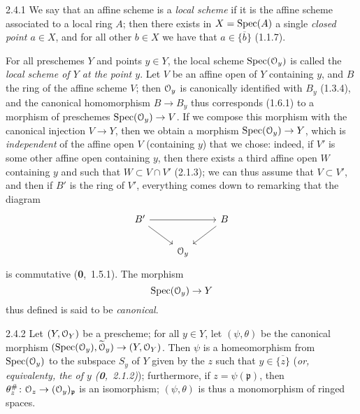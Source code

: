 \documentclass[../main.tex]{subfiles}
\begin{document}
    \begin{cx}{2.4.1}
        We say that an affine scheme is a \emph{local scheme} if it is the affine scheme associated to a local ring $A$; then there exists in $X=\operatorname{Spec}(A)$ a single \emph{closed point $a\in X$}, and for all other $b\in X$ we have that $a\in\overline{\{b\}}$ (1.1.7).
    \end{cx}
    
    For all preschemes $Y$ and points $y\in Y$, the local scheme $\operatorname{Spec}(\mathcal{O}_y)$ is called the \emph{local scheme of $Y$ at the point $y$}.
    Let $V$ be an affine open of $Y$ containing $y$, and $B$ the ring of the affine scheme $V$; then $\mathcal{O}_y$ is canonically identified with $B_y$ (1.3.4), and the canonical homomorphism $B\to B_y$ thus corresponds (1.6.1) to a morphism of preschemes $\operatorname{Spec}(\mathcal{O}_y)\to V$.
    If we compose this morphism with the canonical injection $V\to Y$, then we obtain a morphism $\operatorname{Spec}(\mathcal{O}_y)\to Y$, which is \emph{independent} of the affine open $V$ (containing $y$) that we chose: indeed, if $V'$ is some other affine open containing $y$, then there exists a third affine open $W$ containing $y$ and such that $W\subset V\cap V'$ (2.1.3); we can thus assume that $V\subset V'$, and then if $B'$ is the ring of $V'$, everything comes down to remarking that the diagram
    \begin{equation*}
        \begin{tikzcd}
            B'\arrow[rr]\arrow[dr]&&B\arrow[dl]\\
            &\O_y&
        \end{tikzcd}
    \end{equation*}
    is commutative (\textbf{0},~1.5.1).
    The morphism
    \begin{equation*}
        \operatorname{Spec}(\mathcal{O}_y)\to Y
    \end{equation*}
    thus defined is said to be \emph{canonical}.
    
    \begin{cx}[Proposition]{2.4.2}
        Let $(Y,\mathcal{O}_Y)$ be a prescheme; for all $y\in Y$, let $(\psi,\theta)$ be the canonical morphism $(\operatorname{Spec}(\mathcal{O}_y),\widetilde{\mathcal{O}}_y)\to(Y,\mathcal{O}_Y)$.
        Then $\psi$ is a homeomorphism from $\operatorname{Spec}(\mathcal{O}_y)$ to the subspace $S_y$ of $Y$ given by the $z$ such that $y\in\overline{\{z\}}$ (\emph{or, equivalenty, the \emph{} of $y$ (\textbf{0},~2.1.2)}); furthermore, if $z=\psi(\mathfrak{p})$, then $\theta_z^\#\colon\mathcal{O}_z\to(\mathcal{O}_y)_\mathfrak{p}$ is an isomorphism; $(\psi,\theta)$ is thus a monomorphism of ringed spaces.
    \end{cx}
    
\end{document}
